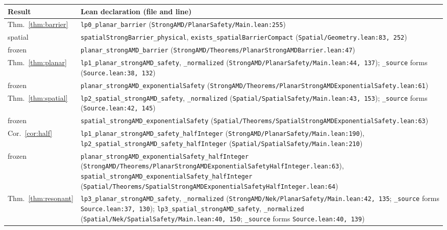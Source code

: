 \begin{table}[htb]
\centering\footnotesize
\begin{tabular}{@{}l>{\raggedright\arraybackslash}p{14cm}@{}}
\toprule
Result & Lean declaration (file and line)\\
\midrule
Thm.~\ref{thm:barrier} & \texttt{lp0\_planar\_barrier} (\texttt{StrongAMD/PlanarSafety/Main.lean:255})\\
\quad spatial & \texttt{spatialStrongBarrier\_physical}, \texttt{exists\_spatialBarrierCompact}
  (\texttt{Spatial/Geometry.lean:83, 252})\\
\quad frozen & \texttt{planar\_strongAMD\_barrier} (\texttt{StrongAMD/Theorems/PlanarStrongAMDBarrier.lean:47})\\
Thm.~\ref{thm:planar} & \texttt{lp1\_planar\_strongAMD\_safety}, \texttt{\_normalized}
  (\texttt{StrongAMD/PlanarSafety/Main.lean:44, 137}); \texttt{\_source} forms (\texttt{Source.lean:38, 132})\\
\quad frozen & \texttt{planar\_strongAMD\_exponentialSafety}
  (\texttt{StrongAMD/Theorems/PlanarStrongAMDExponentialSafety.lean:61})\\
Thm.~\ref{thm:spatial} & \texttt{lp2\_spatial\_strongAMD\_safety}, \texttt{\_normalized}
  (\texttt{Spatial/SpatialSafety/Main.lean:43, 153}); \texttt{\_source} forms (\texttt{Source.lean:42, 145})\\
\quad frozen & \texttt{spatial\_strongAMD\_exponentialSafety}
  (\texttt{Spatial/Theorems/SpatialStrongAMDExponentialSafety.lean:63})\\
Cor.~\ref{cor:half} & \texttt{lp1\_planar\_strongAMD\_safety\_halfInteger}
  (\texttt{StrongAMD/PlanarSafety/Main.lean:190}), \texttt{lp2\_spatial\_strongAMD\_safety\_halfInteger}
  (\texttt{Spatial/SpatialSafety/Main.lean:210})\\
\quad frozen & \texttt{planar\_strongAMD\_exponentialSafety\_halfInteger}
  (\texttt{StrongAMD/Theorems/PlanarStrongAMDExponentialSafetyHalfInteger.lean:63}),
  \texttt{spatial\_strongAMD\_exponentialSafety\_halfInteger}
  (\texttt{Spatial/Theorems/SpatialStrongAMDExponentialSafetyHalfInteger.lean:64})\\
Thm.~\ref{thm:resonant} & \texttt{lp3\_planar\_strongAMD\_safety}, \texttt{\_normalized}
  (\texttt{StrongAMD/Nek/PlanarSafety/Main.lean:42, 135}; \texttt{\_source} forms \texttt{Source.lean:37, 130});
  \texttt{lp3\_spatial\_strongAMD\_safety}, \texttt{\_normalized}
  (\texttt{Spatial/Nek/SpatialSafety/Main.lean:40, 150}; \texttt{\_source} forms \texttt{Source.lean:40, 139})\\

\end{tabular}
\end{table}
